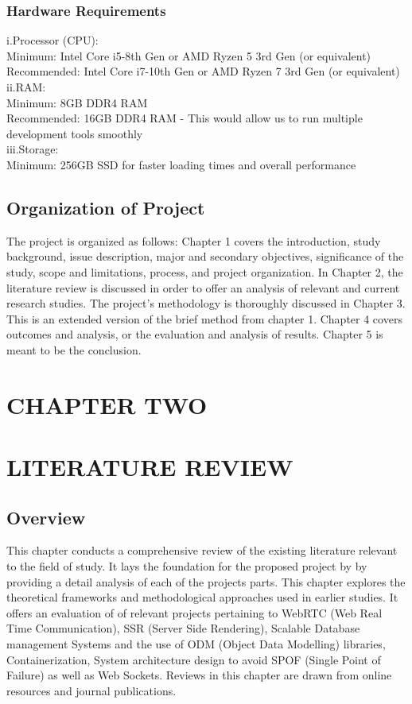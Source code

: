 \documentclass[a4paper,12pt]{article}  %
\begin{document}
\subsubsection{Hardware Requirements}
i.Processor (CPU):\\ Minimum: Intel Core i5-8th Gen or AMD Ryzen 5 3rd Gen (or
equivalent)\\ Recommended: Intel Core i7-10th Gen or AMD Ryzen 7 3rd Gen (or
equivalent)\\ ii.RAM: \\ Minimum: 8GB DDR4 RAM\\ Recommended: 16GB DDR4 RAM -
This would allow us to run multiple development tools smoothly\\ iii.Storage:\\
Minimum: 256GB SSD for faster loading times and overall performance\\

\subsection{Organization of Project}

The project is organized as follows: Chapter 1 covers the introduction, study
background, issue description, major and secondary objectives, significance of
the study, scope and limitations, process, and project organization. In Chapter
2, the literature review is discussed in order to offer an analysis of relevant
and current research studies. The project's methodology is thoroughly discussed
in Chapter 3. This is an extended version of the brief method from chapter 1.
Chapter 4 covers outcomes and analysis, or the evaluation and analysis of
results. Chapter 5 is meant to be the conclusion.\\ \newpage

\begin{center}
      \section*{CHAPTER TWO}
      \section{LITERATURE REVIEW}
\end{center}
\subsection{Overview}
This chapter conducts a comprehensive review of the existing literature
relevant to the field of study. It lays the foundation for the proposed project
by by providing a detail analysis of each of the projects parts. This chapter
explores the theoretical frameworks and methodological approaches used in
earlier studies. It offers an evaluation of of relevant projects pertaining to
WebRTC (Web Real Time Communication), SSR (Server Side Rendering), Scalable
Database management Systems and the use of ODM (Object Data Modelling)
libraries, Containerization, System architecture design to avoid SPOF (Single
Point of Failure) as well as Web Sockets. Reviews in this chapter are drawn
from online resources and journal publications.\\
\end{document}
